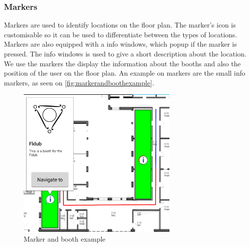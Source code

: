 \subsubsection*{Markers}
Markers are used to identify locations on the floor plan. The marker's icon is customisable so it can be used to differentiate between the types of locations. Markers are also equipped with a info windows, which popup if the marker is pressed. The info windows is used to give a short description about the location. We use the markers the display the information about the booths and also the position of the user on the floor plan. An example on markers are the small info markers, as seen on \autoref{fig:markerandboothexample}. 
\begin{figure}[H]
\centering
\includegraphics[width=0.7\textwidth]{img/markerandbooth.png}
\caption{Marker and booth example}
\label{fig:markerandboothexample}
\end{figure}

